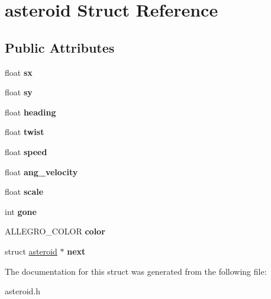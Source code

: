 \hypertarget{structasteroid}{}\section{asteroid Struct Reference}
\label{structasteroid}
\subsection*{Public Attributes}
\begin{DoxyCompactItemize}
\item 
\hypertarget{structasteroid_a97b8373c97283c0d68d13435605ece53}{}float {\bfseries sx}\label{structasteroid_a97b8373c97283c0d68d13435605ece53}

\item 
\hypertarget{structasteroid_a7d70f15b142b18ddb449f04022abaf94}{}float {\bfseries sy}\label{structasteroid_a7d70f15b142b18ddb449f04022abaf94}

\item 
\hypertarget{structasteroid_a6387895baedec91c4251cab5dae6bdbf}{}float {\bfseries heading}\label{structasteroid_a6387895baedec91c4251cab5dae6bdbf}

\item 
\hypertarget{structasteroid_a2145478c7cd6a2672324951b65a9c8a2}{}float {\bfseries twist}\label{structasteroid_a2145478c7cd6a2672324951b65a9c8a2}

\item 
\hypertarget{structasteroid_a724b944f732c72b57c78e3e53bf80399}{}float {\bfseries speed}\label{structasteroid_a724b944f732c72b57c78e3e53bf80399}

\item 
\hypertarget{structasteroid_a39613525f990b7e68cce2b3f068bfa2e}{}float {\bfseries ang\+\_\+velocity}\label{structasteroid_a39613525f990b7e68cce2b3f068bfa2e}

\item 
\hypertarget{structasteroid_a317bedd42f02e5f8c60f7be86058b554}{}float {\bfseries scale}\label{structasteroid_a317bedd42f02e5f8c60f7be86058b554}

\item 
\hypertarget{structasteroid_a798a5ad0c8a96de0b74ff921a0cae1b4}{}int {\bfseries gone}\label{structasteroid_a798a5ad0c8a96de0b74ff921a0cae1b4}

\item 
\hypertarget{structasteroid_ab361271d16c17aab987d7d0d0e2a9a0d}{}A\+L\+L\+E\+G\+R\+O\+\_\+\+C\+O\+L\+O\+R {\bfseries color}\label{structasteroid_ab361271d16c17aab987d7d0d0e2a9a0d}

\item 
\hypertarget{structasteroid_a25f229d6f0c64284807d0549c703f7ed}{}struct \hyperlink{structasteroid}{asteroid} $\ast$ {\bfseries next}\label{structasteroid_a25f229d6f0c64284807d0549c703f7ed}

\end{DoxyCompactItemize}


The documentation for this struct was generated from the following file\+:\begin{DoxyCompactItemize}
\item 
asteroid.\+h\end{DoxyCompactItemize}
